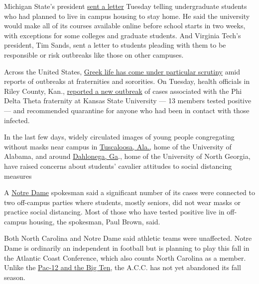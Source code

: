 Michigan State's president
\href{https://president.msu.edu/communications/messages-statements/2020_community_letters/2020-08-18-plans-change.html}{sent
a letter} Tuesday telling undergraduate students who had planned to live
in campus housing to stay home. He said the university would make all of
its courses available online before school starts in two weeks, with
exceptions for some colleges and graduate students. And Virginia Tech's
president, Tim Sands, sent a letter to students pleading with them to be
responsible or risk outbreaks like those on other campuses.

Across the United States,
\href{https://www.nytimes3xbfgragh.onion/2020/08/18/us/coronavirus-fraternities-sororities.html}{Greek
life has come under particular scrutiny} amid reports of outbreaks at
fraternities and sororities. On Tuesday, health officials in Riley
County, Kan.,
\href{https://www.rileycountyks.gov/CivicAlerts.aspx?AID=1178}{reported
a new outbreak} of cases associated with the Phi Delta Theta fraternity
at Kansas State University --- 13 members tested positive --- and
recommended quarantine for anyone who had been in contact with those
infected.

In the last few days, widely circulated images of young people
congregating without masks near campus in
\href{https://abc3340.com/news/coronavirus/social-media-images-of-lines-outside-tuscaloosa-bars-draws-ire-of-alabamas-ad}{Tuscaloosa,
Ala.,} home of the University of Alabama, and around
\href{https://www.facebookcorewwwi.onion/watch/?v=905235006636836}{Dahlonega,
Ga}., home of the University of North Georgia, have raised concerns
about students' cavalier attitudes to social distancing measures

A
\href{https://www.americamagazine.org/politics-society/2020/08/18/notre-dame-coronavirus-students-positive}{Notre
Dame} spokesman said a significant number of its cases were connected to
two off-campus parties where students, mostly seniors, did not wear
masks or practice social distancing. Most of those who have tested
positive live in off-campus housing, the spokesman, Paul Brown, said.

Both North Carolina and Notre Dame said athletic teams were unaffected.
Notre Dame is ordinarily an independent in football but is planning to
play this fall in the Atlantic Coast Conference, which also counts North
Carolina as a member. Unlike the
\href{https://www.nytimes3xbfgragh.onion/2020/08/11/sports/ncaafootball/big-ten-postpones-football-season.html}{Pac-12
and the Big Ten}, the A.C.C. has not yet abandoned its fall season.

